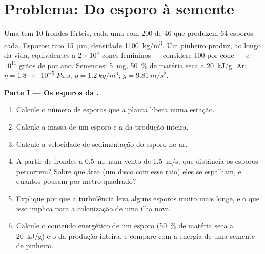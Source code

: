 \section{Problema: Do esporo à semente}

\begin{problem}
\label{pb:b2:plant-life-cycles:1}
Uma  tem \num{10} frondes férteis, cada uma com \num{200}
 de \num{40}  que produzem \num{64} esporos cada.
Esporos: raio \qty{15}{\micro m}, densidade \qty{1100}{kg/m^3}. Um
pinheiro produz, ao longo da vida,  equivalentes a
$2\times 10^{4}$ cones femininos --- considere \num{100}  por
cone --- e $10^{11}$ grãos de  por ano. Sementes: \qty{5}{mg},
\qty{50}{\%} de matéria seca a
\qty{20}{kJ/g}. Ar: $\eta = \qty{1.8e-5}{Pa.s}$, $\rho =
\qty{1.2}{kg/m^3}$; $g = \qty{9.81}{m/s^2}$.

\medskip
\noindent\textbf{Parte I --- Os esporos da .}
\begin{enumerate}
  \item Calcule o número de esporos que a planta libera numa estação.
  \item Calcule a massa de um esporo e a da produção inteira.
  \item Calcule a velocidade de sedimentação do esporo no ar.
  \item A partir de frondes a \qty{0.5}{m}, num vento de
        \qty{1.5}{m/s}, que distância os esporos percorrem? Sobre que
        área (um disco com esse raio) eles se espalham, e quantos
        pousam por metro quadrado?
  \item Explique por que a turbulência leva alguns esporos muito mais
        longe, e o que isso implica para a colonização de uma ilha nova.
  \item Calcule o conteúdo energético de um esporo (\qty{50}{\%} de
        matéria seca a \qty{20}{kJ/g}) e o da produção inteira, e
        compare com a energia de uma semente de pinheiro.
\end{enumerate}


\end{problem}
